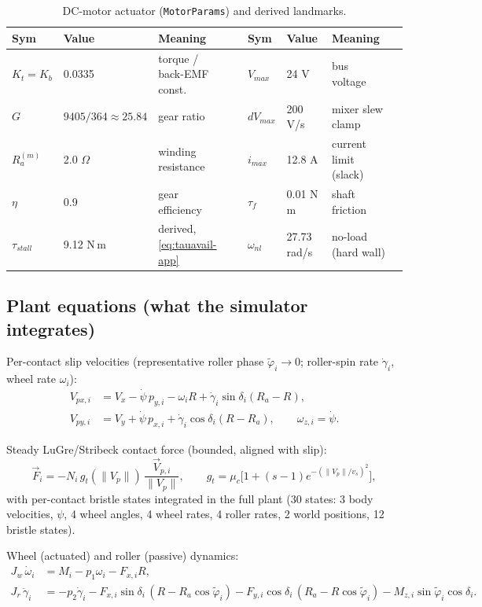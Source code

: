 \documentclass[11pt]{article}
\begin{document}
\begin{table}[h]\centering\footnotesize
\caption{DC-motor actuator (\texttt{MotorParams}) and derived landmarks.}
\label{tab:motorapp}
\begin{tabular}{llll@{\hskip 2em}llll}
\toprule
Sym & Value & Meaning & & Sym & Value & Meaning\\
\midrule
$K_t=K_b$ & 0.0335 & torque / back-EMF const. & & $V_{max}$ & 24 V & bus voltage\\
$G$ & $9405/364\approx25.84$ & gear ratio & & $dV_{max}$ & 200 V/s & mixer slew clamp\\
$R_a^{(m)}$ & 2.0 $\Omega$ & winding resistance & & $i_{max}$ & 12.8 A & current limit (slack)\\
$\eta$ & 0.9 & gear efficiency & & $\tau_f$ & 0.01 N\,m & shaft friction\\
$\tau_{stall}$ & 9.12 N\,m & derived, \eqref{eq:tauavail-app} & & $\omega_{nl}$ & 27.73 rad/s & no-load (hard wall)\\
\bottomrule
\end{tabular}
\end{table}

\subsection{Plant equations (what the simulator integrates)}
\label{app:plant-eqs}

Per-contact slip velocities (representative roller phase $\tilde\varphi_i\to0$;
roller-spin rate $\dot\gamma_i$, wheel rate $\omega_i$):
\begin{align}
V_{px,i}&=V_x-\dot\psi\,p_{y,i}-\omega_i R+\dot\gamma_i\sin\delta_i(R_a-R),\\
V_{py,i}&=V_y+\dot\psi\,p_{x,i}+\dot\gamma_i\cos\delta_i(R-R_a),
\qquad \omega_{z,i}=\dot\psi .
\end{align}

Steady LuGre/Stribeck contact force (bounded, aligned with slip):
\begin{equation}
\vec F_i=-N_i\,g_t(\|V_p\|)\,\frac{\vec V_{p,i}}{\|V_p\|},\qquad
g_t=\mu_c\Big[1+(s-1)e^{-(\|V_p\|/v_s)^2}\Big],
\end{equation}
with per-contact bristle states integrated in the full plant (30 states:
3 body velocities, $\psi$, 4 wheel angles, 4 wheel rates, 4 roller rates,
2 world positions, 12 bristle states).

Wheel (actuated) and roller (passive) dynamics:
\begin{align}
J_w\,\dot\omega_i &= M_i - p_1\omega_i - F_{x,i}R,\\
J_r\,\ddot\gamma_i &= -p_2\dot\gamma_i
 - F_{x,i}\sin\delta_i\,(R-R_a\cos\tilde\varphi_i)
 - F_{y,i}\cos\delta_i\,(R_a-R\cos\tilde\varphi_i)
 - M_{z,i}\sin\tilde\varphi_i\cos\delta_i .
\end{align}
\end{document}
